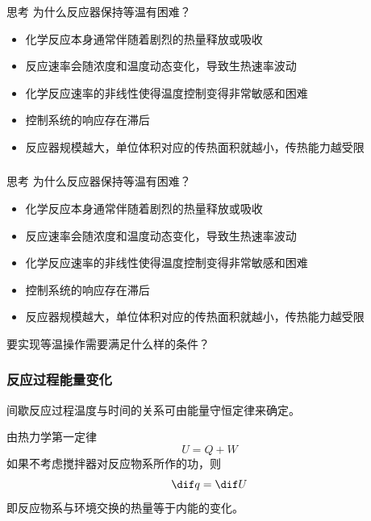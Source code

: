 \documentclass[dvipsnames, svgnames, x11names]{beamer}
\begin{document}
\begin{frame}[t]
    \frametitle{}
    \begin{redblock}{思考}
        为什么反应器保持等温有困难？
        \tcblower
        \pause
        \begin{itemize}
          \item 化学反应本身通常伴随着剧烈的热量释放或吸收
          \item 反应速率会随浓度和温度动态变化，导致生热速率波动
          \item 化学反应速率的非线性使得温度控制变得非常敏感和困难
          \item 控制系统的响应存在滞后
          \item 反应器规模越大，单位体积对应的传热面积就越小，传热能力越受限
        \end{itemize}
    \end{redblock}
\end{frame}


\begin{frame}[t]
    \frametitle{}
    \begin{redblock}{思考}
        为什么反应器保持等温有困难？
        \tcblower
        \begin{itemize}
          \item 化学反应本身通常伴随着剧烈的热量释放或吸收
          \item 反应速率会随浓度和温度动态变化，导致生热速率波动
          \item 化学反应速率的非线性使得温度控制变得非常敏感和困难
          \item 控制系统的响应存在滞后
          \item 反应器规模越大，单位体积对应的传热面积就越小，传热能力越受限
        \end{itemize}
    \end{redblock}
    \begin{alertblock}{}
        要实现等温操作需要满足什么样的条件？
    \end{alertblock}
\end{frame}


\begin{frame}
    \frametitle{反应过程能量变化}

    间歇反应过程温度与时间的关系可由能量守恒定律来确定。

    由热力学第一定律
    \[
        U = Q + W
    \]
    如果不考虑搅拌器对反应物系所作的功，则
    {\huge\[
        \dif q = \dif U
    \]}
    即反应物系与环境交换的热量等于内能的变化。
\end{frame}
\end{document}
